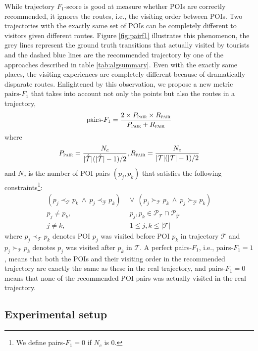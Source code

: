 While trajectory $F_1$-score is good at measure whether POIs are correctly recommended,
it ignores the routes, i.e., the visiting order between POIs.
Two trajectories with the exactly same set of POIs can be completely different to visitors 
given different routes.
Figure \ref{fig:pairf1} illustrates this phenomenon,
the grey lines represent the ground truth transitions that actually visited by tourists
and the dashed blue lines are the recommended trajectory by one of the approaches described
in table \ref{tab:algsummary}.
Even with the exactly same places, the visiting experiences are completely different because 
of dramatically disparate routes.
Enlightened by this observation, we propose a new metric $\text{pairs-}F_1$ that takes into account 
not only the points but also the routes in a trajectory,
\begin{displaymath}
\text{pairs-}F_1 = \frac{2 \times P_{\textsc{pair}} \times R_{\textsc{pair}}}
                       {P_{\textsc{pair}} + R_{\textsc{pair}}}
\end{displaymath}
where
\begin{displaymath}
P_{\textsc{pair}} = \frac{N_c} {|\hat{\mathcal{T}}|(|\hat{\mathcal{T}}|-1) / 2},
R_{\textsc{pair}} = \frac{N_c} {|\mathcal{T}|(|\mathcal{T}|-1) / 2}
\end{displaymath}
and $N_c$ is the number of POI pairs $(p_j, p_k)$ that satisfies the following
constraints\footnote{We define pairs-$F_1=0$ if $N_c$ is $0$.}:
\begin{align*}
    (p_j \prec_{\mathcal{T}} p_k ~\land~ p_j \prec_{\hat{\mathcal{T}}} p_k) & ~\lor~
    (p_j \succ_{\mathcal{T}} p_k ~\land~ p_j \succ_{\hat{\mathcal{T}}} p_k) \\
    p_j \ne p_k, &~~ p_j, p_k \in \mathcal{P}_{\mathcal{T}} \cap \mathcal{P}_{\hat{\mathcal{T}}} \\
    j \ne k, &~~ 1 \le j, k \le |\mathcal{T}|
\end{align*}
where $p_j \prec_{\mathcal{T}} p_k$ denotes POI $p_j$ was visited before POI $p_k$ in trajectory $\mathcal{T}$
and $p_j \succ_{\mathcal{T}} p_k$ denotes $p_j$ was visited after $p_k$ in $\mathcal{T}$.
A perfect pairs-$F_1$, i.e., pairs-$F_1 = 1$, means that both the POIs and their visiting order in the
recommended trajectory are exactly the same as these in the real trajectory,
and pairs-$F_1 = 0$ means that none of the recommended POI pairs was actually visited in the real trajectory.


\subsection{Experimental setup}
\label{sec:setup}

